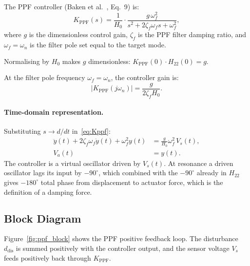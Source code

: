 \documentclass[12pt,a4paper]{article}
\begin{document}
The PPF controller (Baken et al.~\cite{baken2025}, Eq.~9) is:
\begin{equation}
  \boxed{K_\text{PPF}(s) =
    \frac{1}{H_0}
    \cdot
    \frac{g\,\omega_f^2}{s^2 + 2\zeta_f\omega_f s + \omega_f^2}},
  \label{eq:Kppf}
\end{equation}
where $g$ is the dimensionless control gain, $\zeta_f$ is the PPF filter damping
ratio, and $\omega_f = \omega_n$ is the filter pole set equal to the target mode.

Normalising by $H_0$ makes $g$ dimensionless: $K_\text{PPF}(0) \cdot H_{22}(0) = g$.

At the filter pole frequency $\omega_f = \omega_n$, the controller gain is:
\begin{equation}
  |K_\text{PPF}(j\omega_n)| = \frac{g}{2\zeta_f H_0}.
\end{equation}

\paragraph{Time-domain representation.}
Substituting $s \to d/dt$ in~\eqref{eq:Kppf}:
\begin{align}
  \ddot{y}(t) + 2\zeta_f\omega_f\dot{y}(t) + \omega_f^2 y(t)
      &= \frac{g}{H_0}\omega_f^2\,V_s(t), \\
  V_a(t) &= y(t).
\end{align}
The controller is a virtual oscillator driven by $V_s(t)$.  At resonance a driven
oscillator lags its input by $-90^\circ$, which combined with the $-90^\circ$
already in $H_{22}$ gives $-180^\circ$ total phase from displacement to actuator
force, which is the definition of a damping force.

\subsection{Block Diagram}
\label{sec:ppf_block}

Figure~\ref{fig:ppf_block} shows the PPF positive feedback loop.  The disturbance
$d_\text{dis}$ is summed positively with the controller output, and the sensor
voltage $V_s$ feeds positively back through $K_\text{PPF}$.
\end{document}

